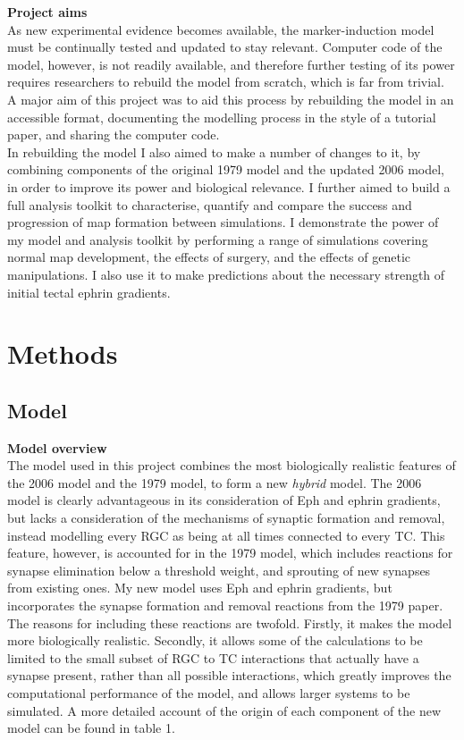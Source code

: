 \documentclass[11pt]{"article"}
\begin{document}
\pagebreak

\textbf{Project aims}\\
As new experimental evidence becomes available, the marker-induction model must be continually tested and updated to stay relevant. Computer code of the model, however, is not readily available, and therefore further testing of its power requires researchers to rebuild the model from scratch, which is far from trivial. A major aim of this project was to aid this process by rebuilding the model in an accessible format, documenting the modelling process in the style of a tutorial paper, and sharing the computer code.\\

In rebuilding the model I also aimed to make a number of changes to it, by combining components of the original 1979 model and the updated 2006 model, in order to improve its power and biological relevance. I further aimed to build a full analysis toolkit to characterise, quantify and compare the success and progression of map formation between simulations. I demonstrate the power of my model and analysis toolkit by performing a range of simulations covering normal map development, the effects of surgery, and the effects of genetic manipulations. I also use it to make predictions about the necessary strength of initial tectal ephrin gradients.


\section{Methods}

\subsection{Model}

\vspace{10pt}

\textbf{Model overview}\\
The model used in this project combines the most biologically realistic features of the 2006 model and the 1979 model, to form a new \textit{hybrid} model. The 2006 model is clearly advantageous in its consideration of Eph and ephrin gradients, but lacks a consideration of the mechanisms of synaptic formation and removal, instead modelling every RGC as being at all times connected to every TC. This feature, however, is accounted for in the 1979 model, which includes reactions for synapse elimination below a threshold weight, and sprouting of new synapses from existing ones. My new model uses Eph and ephrin gradients, but incorporates the synapse formation and removal reactions from the 1979 paper. The reasons for including these reactions are twofold. Firstly, it makes the model more biologically realistic. Secondly, it allows some of the calculations to be limited to the small subset of RGC to TC interactions that actually have a synapse present, rather than all possible interactions, which greatly improves the computational performance of the model, and allows larger systems to be simulated. A more detailed account of the origin of each component of the new model can be found in table 1.\\ 
\end{document}
